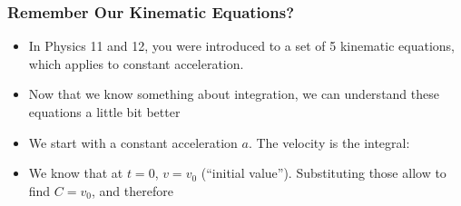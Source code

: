 \documentclass[12pt,compress,aspectratio=169]{beamer}
\begin{document}
%
%
%
%
%

\begin{frame}
  \frametitle{Remember Our Kinematic Equations?}
  \begin{itemize}
  \item In Physics 11 and 12, you were introduced to a set of 5 kinematic
    equations, which applies to constant acceleration.
  \item Now that we know something about integration, we can understand these
    equations a little bit better
  \item We start with a constant acceleration $a$. The velocity is the integral:
    
    \vspace{-.2in}{\Large
      \begin{displaymath}
        v(t)=\int adt=at+C
      \end{displaymath}
    }
  \item We know that at $t=0$, $v=v_0$ (``initial value''). Substituting those
    allow to find $C=v_0$, and therefore
    
  \end{itemize}
\end{frame}
\end{document}
